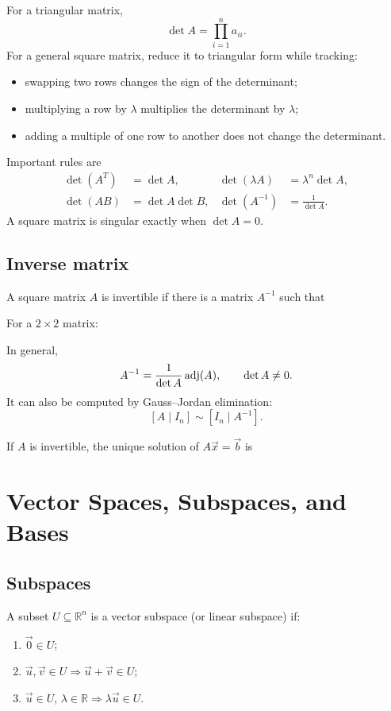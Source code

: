 \documentclass{article}
\begin{document}
For a triangular matrix,
\[
    \det A=\prod_{i=1}^{n}a_{ii}.
\]
For a general square matrix, reduce it to triangular form while
tracking:
\begin{itemize}
    \item swapping two rows changes the sign of the determinant;
    \item multiplying a row by $\lambda$ multiplies the determinant
          by $\lambda$;
    \item adding a multiple of one row to another does not change the
          determinant.
\end{itemize}

Important rules are
\begin{align*}
    \det(A^T)&=\det A,&
    \det(\lambda A)&=\lambda^n\det A,\\
    \det(AB)&=\det A\det B,&
    \det(A^{-1})&=\frac{1}{\det A}.
\end{align*}
A square matrix is singular exactly when $\det A=0$.

\subsection{Inverse matrix}
A square matrix $A$ is invertible if there is a matrix $A^{-1}$ such
that

For a $2\times2$ matrix:

In general,
\[
    A^{-1}=\frac{1}{\det A}\operatorname{adj}(A),
    \qquad \det A\neq0.
\]
It can also be computed by Gauss--Jordan elimination:
\[
    [A\mid I_n]\sim[I_n\mid A^{-1}].
\]

If $A$ is invertible, the unique solution of $A\vec{x}=\vec{b}$ is

\section{Vector Spaces, Subspaces, and Bases}

\subsection{Subspaces}
A subset $U\subseteq\mathbb{R}^n$ is a vector subspace (or linear subspace) if:
\begin{enumerate}[label=U\arabic*)]
    \item $\vec{0}\in U$;
    \item $\vec{u},\vec{v}\in U\Longrightarrow\vec{u}+\vec{v}\in U$;
    \item $\vec{u}\in U$, $\lambda\in\mathbb{R}
          \Longrightarrow\lambda\vec{u}\in U$.
\end{enumerate}
\end{document}
